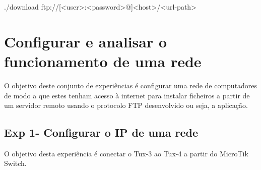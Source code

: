 \documentclass[11pt,a4paper,twocolumn]{report}
\begin{document}
\begin{bash-darktheme}
./download ftp://[<user>:<password>@]<host>/<url-path>
\end{bash-darktheme}


\section{Configurar e analisar o funcionamento de uma rede}

O objetivo deste conjunto de experiências é configurar uma rede de computadores de modo a que estes tenham acesso à internet para instalar ficheiros a partir de um servidor remoto usando o protocolo FTP desenvolvido ou seja, a aplicação.


\subsection{Exp 1- Configurar o IP de uma rede}

O objetivo desta experiência é conectar o Tux-3 ao Tux-4 a partir do MicroTik Switch.
\end{document}
